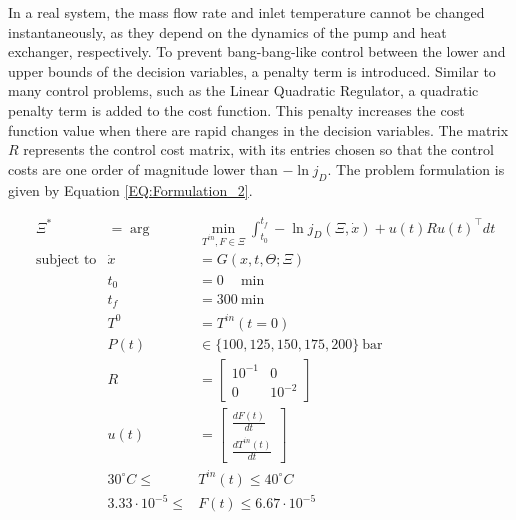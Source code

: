 \documentclass[../Article_Design_of_Experiment.tex]{subfiles}
\begin{document}

	In a real system, the mass flow rate and inlet temperature cannot be changed instantaneously, as they depend on the dynamics of the pump and heat exchanger, respectively. To prevent bang-bang-like control between the lower and upper bounds of the decision variables, a penalty term is introduced. Similar to many control problems, such as the Linear Quadratic Regulator, a quadratic penalty term is added to the cost function. This penalty increases the cost function value when there are rapid changes in the decision variables. The matrix $R$ represents the control cost matrix, with its entries chosen so that the control costs are one order of magnitude lower than $-\ln j_D$. The problem formulation is given by Equation \ref{EQ:Formulation_2}.
	
	{\footnotesize
		\begin{equation}
			\begin{aligned} 
				&\Xi^* &= \arg &\min_{ T^{in}, F \in \Xi} \int_{t_0}^{t_f} - \ln j_D(\Xi,\dot{x}) + u(t) R u(t)^\top dt  \\
				&\text{subject to}
				& \dot{x} &= G(x,t,\Theta;\Xi) \\
				&& t_0&=0\quad~\text{min} \\
				&& t_f&=300~\text{min} \\
				&& T^{0} &= T^{in}(t=0) \\
				&& P(t) & \in \{100, 125, 150, 175, 200\}~\text{bar} \\
				&& R &= \begin{bmatrix}
						10^{-1} & 0  \\
						0 & 10^{-2}
					\end{bmatrix}  \\
				&& u(t) &= \begin{bmatrix}
					\frac{dF(t)}{dt}  \\
					\frac{dT^{in}(t)}{dt} 
				\end{bmatrix}  \\
				&& 30^\circ C \leq &T^{in}(t) \leq 40^\circ C \\
				&& 3.33 \cdot 10^{-5} \leq &F(t) \leq 6.67 \cdot 10^{-5}
			\end{aligned} \label{EQ:Formulation_2}
	\end{equation} } 
\end{document}
